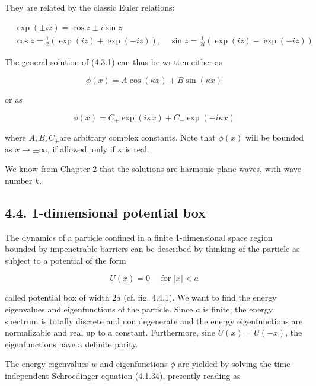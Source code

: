\documentclass{article}
\begin{document}
They are related by the classic Euler relations:
 
\begin{align*}
& \exp ( \pm i z)=\cos z \pm i \sin z  \tag{4.3.6}\\
& \cos z=\frac{1}{2}(\exp (i z)+\exp (-i z)), \quad \sin z=\frac{1}{2 i}(\exp (i z)-\exp (-i z)) \tag{4.3.7}
\end{align*}
 

The general solution of (4.3.1) can thus be written either as
 
\begin{equation*}
\phi(x)=A \cos (\kappa x)+B \sin (\kappa x) \tag{4.3.8}
\end{equation*}
 
or as
 
\begin{equation*}
\phi(x)=C_{+} \exp (i \kappa x)+C_{-} \exp (-i \kappa x) \tag{4.3.9}
\end{equation*}
 
where $A, B, C_{ \pm}$are arbitrary complex constants. Note that $\phi(x)$ will be bounded as $x \rightarrow \pm \infty$, if allowed, only if $\kappa$ is real.

We know from Chapter 2 that the solutions are harmonic plane waves, with wave number $k$.

\subsection*{4.4. 1-dimensional potential box}

The dynamics of a particle confined in a finite 1-dimensional space region bounded by impenetrable barriers can be described by thinking of the particle as subject to a potential of the form
 
\begin{equation*}
U(x)=0 \quad \text { for }|x|<a \tag{4.4.1}
\end{equation*}
 
called potential box of width $2 a$ (cf. fig. 4.4.1). We want to find the energy eigenvalues and eigenfunctions of the particle. Since $a$ is finite, the energy spectrum is totally discrete and non degenerate and the energy eigenfunctions are normalizable and real up to a constant. Furthermore, sine $U(x)=U(-x)$, the eigenfunctions have a definite parity.

The energy eigenvalues $w$ and eigenfunctions $\phi$ are yielded by solving the time independent Schroedinger equation (4.1.34), presently reading as
 
\end{document}

